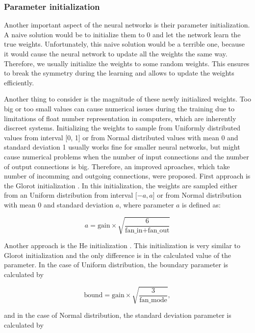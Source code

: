 \subsubsection{Parameter initialization}
Another important aspect of the neural networks is their parameter initialization.
A naive solution would be to initialize them to 0 and let the network learn the true weights.
Unfortunately, this naive solution would be a terrible one, because it would cause the neural network to update all the weights the same way.
Therefore, we usually initialize the weights to some random weights.
This ensures to break the symmetry during the learning and allows to update the weights efficiently.

Another thing to consider is the magnitude of these newly initialized weights.
Too big or too small values can cause numerical issues during the training due to limitations of float number representation in computers, which are inherently discreet systems.
Initializing the weights to sample from Uniformly distributed values from interval [0, 1] or from Normal distributed values with mean 0 and standard deviation 1 usually works fine for smaller neural networks, but might cause numerical problems when the number of input connections and the number of output connections is big.
Therefore, an improved aproaches, which take number of incomming and outgoing connections, were proposed.
First approach is the Glorot initialization \cite{glorot2010understanding}.
In this initialization, the weights are sampled either from an Uniform distribution from interval [$-a, a$] or from Normal distribution with mean 0 and standard deviation $a$, where parameter $a$ is defined as:

\begin{equation}
    a = \text{gain} \times \sqrt{\frac{6}{\text{fan\_in} + \text{fan\_out}}}
\end{equation}

Another approach is the He initialization \cite{he2015delving}.
This initialization is very similar to Glorot initialization and the only difference is in the calculated value of the parameter.
In the case of Uniform distribution, the boundary parameter is calculated by

\begin{equation}
    \text{bound} = \text{gain} \times \sqrt{\frac{3}{\text{fan\_mode}}},
\end{equation}

and in the case of Normal distribution, the standard deviation parameter is calculated by

